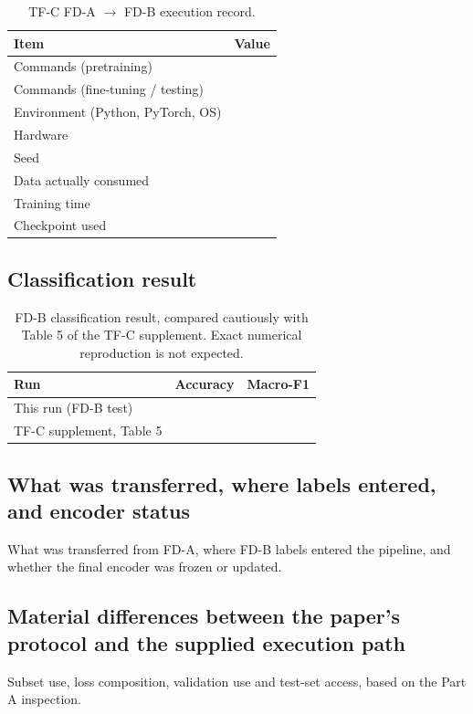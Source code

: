 \documentclass[a4paper,11pt]{article}
\newcommand{\TODOfill}{\todo[inline]{Fill in.}}
\begin{document}
\begin{table}[h]
    \centering
    \small
    \begin{tabular}{l p{9.5cm}}
        \toprule
        Item & Value \\
        \midrule
        Commands (pretraining) & \\
        Commands (fine-tuning / testing) & \\
        Environment (Python, PyTorch, OS) & \\
        Hardware & \\
        Seed & \\
        Data actually consumed & \\
        Training time & \\
        Checkpoint used & \\
        \bottomrule
    \end{tabular}
    \caption{TF-C FD-A $\rightarrow$ FD-B execution record.}
    \label{tab:tfc-record}
\end{table}

\subsection{Classification result}

\begin{table}[h]
    \centering
    \small
    \begin{tabular}{l c c}
        \toprule
        Run & Accuracy & Macro-F1 \\
        \midrule
        This run (FD-B test) & & \\
        TF-C supplement, Table 5 & & \\
        \bottomrule
    \end{tabular}
    \caption{FD-B classification result, compared cautiously with Table 5 of the TF-C supplement. Exact numerical reproduction is not expected.}
    \label{tab:tfc-result}
\end{table}

\subsection{What was transferred, where labels entered, and encoder status}
What was transferred from FD-A, where FD-B labels entered the pipeline, and whether the final
encoder was frozen or updated.
\TODOfill

\subsection{Material differences between the paper's protocol and the supplied execution path}
Subset use, loss composition, validation use and test-set access, based on the Part A inspection.
\TODOfill
\end{document}

